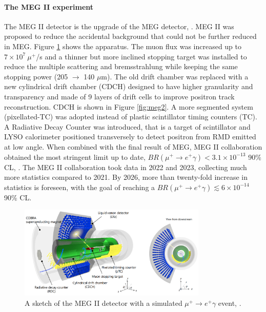 \paragraph{The MEG II experiment}
The MEG II detector is the upgrade of the MEG detector, \cite{megiicollaboration2024operation}.
MEG II was proposed to reduce the accidental background that could not be further reduced in MEG.
Figure \ref{fig:meg22} shows the apparatus. The muon flux was increased up to $7 \times 10^7 \ \mu^+$/s and a thinner but more inclined 
stopping target was installed to reduce the multiple scattering and bremsstrahlung 
while keeping the same stopping power (205 $\rightarrow$ 140 $\mu$m).
The old drift chamber was replaced with a new cylindrical drift chamber (CDCH) designed
to have higher granularity and transparency and made of 9 layers of drift cells to
improve positron track reconstruction. CDCH is shown 
in Figure \ref{fig:meg2}.
A more segmented system (pixellated-TC) was adopted instead of plastic scintillator timing counters (TC).
A Radiative Decay Counter was introduced, that is a target of scintillator and LYSO calorimeter positioned transversely to detect positron from RMD emitted at low angle.
When combined with the final result of MEG, MEG II collaboration obtained the most stringent limit up to date, $BR(\mu^+ \rightarrow e^+ \gamma)<3.1\times 10^{-13}$ 90\% CL, \cite{megiicollaboration2024search}.
The MEG II collaboration took data in 2022 and 2023, collecting much more statistics compared to 2021. By 2026, more than twenty-fold increase in statistics is foreseen, with the goal of reaching a
$BR(\mu^+ \rightarrow e^+ \gamma)\lesssim 6\times 10^{-14}$ 90\% CL.
\begin{figure}[!h]
    \centering
    \includegraphics[width =0.8\textwidth]{figures/png/Screenshot_20240307_140116.png}
    \caption[MEG II detector (I).]{A sketch of the MEG II detector with a simulated $\mu^+ \rightarrow e^+ \gamma $ event, \cite{megiicollaboration2024operation}.}
    \label{fig:meg22}
    \end{figure}

